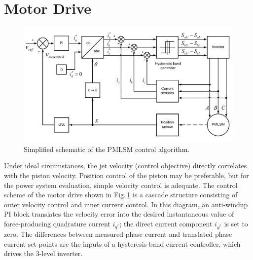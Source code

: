     
\section{Motor Drive}

    \begin{figure}
      \centering
      \includegraphics[width=5.5in]{appA/images/Interleaved_control_scheme_v8.pdf}
      \caption{Simplified schematic of the PMLSM control algorithm.}
      \label{fig:motor_controll_algorithm}
    \end{figure}
    
    Under ideal circumstances, the jet velocity (control objective) directly correlates with the piston velocity. Position control of the piston may be preferable, but for the power system evaluation, simple velocity control is adequate. The control scheme of the motor drive shown in Fig.\,\ref{fig:motor_controll_algorithm} is a cascade structure consisting of outer velocity control and inner current control. In this diagram, an anti-windup PI block translates the velocity error into the desired instantaneous value of force-producing quadrature current $i_{q^{*}}$; the direct current component $i_{d^{*}}$ is set to zero. The differences between measured phase current and translated phase current set points are the inputs of a hysteresis-band current controller, which drives the 3-level inverter. 
    
